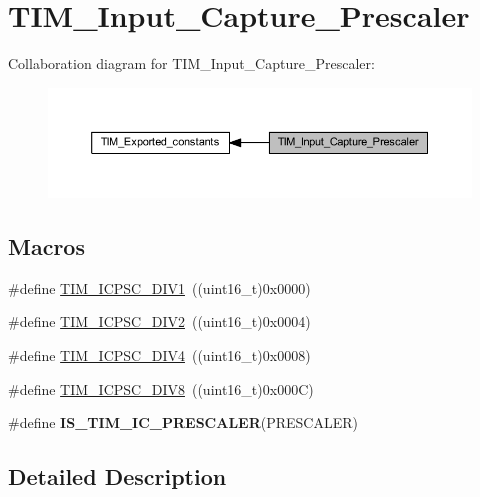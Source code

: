 \hypertarget{group___t_i_m___input___capture___prescaler}{}\section{T\+I\+M\+\_\+\+Input\+\_\+\+Capture\+\_\+\+Prescaler}
\label{group___t_i_m___input___capture___prescaler}
Collaboration diagram for T\+I\+M\+\_\+\+Input\+\_\+\+Capture\+\_\+\+Prescaler\+:
\nopagebreak
\begin{figure}[H]
\begin{center}
\leavevmode
\includegraphics[width=350pt]{group___t_i_m___input___capture___prescaler}
\end{center}
\end{figure}
\subsection*{Macros}
\begin{DoxyCompactItemize}
\item 
\#define \hyperlink{group___t_i_m___input___capture___prescaler_ga8acb44abe3147d883685c1f9f1ce410e}{T\+I\+M\+\_\+\+I\+C\+P\+S\+C\+\_\+\+D\+I\+V1}~((uint16\+\_\+t)0x0000)
\item 
\#define \hyperlink{group___t_i_m___input___capture___prescaler_ga1d8a7b66add914e2ddd910d2d700978f}{T\+I\+M\+\_\+\+I\+C\+P\+S\+C\+\_\+\+D\+I\+V2}~((uint16\+\_\+t)0x0004)
\item 
\#define \hyperlink{group___t_i_m___input___capture___prescaler_gaf5a675046430fa0f0c95b0dac612828f}{T\+I\+M\+\_\+\+I\+C\+P\+S\+C\+\_\+\+D\+I\+V4}~((uint16\+\_\+t)0x0008)
\item 
\#define \hyperlink{group___t_i_m___input___capture___prescaler_ga5086cb03c89a5c67b199d20b605f00cb}{T\+I\+M\+\_\+\+I\+C\+P\+S\+C\+\_\+\+D\+I\+V8}~((uint16\+\_\+t)0x000\+C)
\item 
\#define {\bfseries I\+S\+\_\+\+T\+I\+M\+\_\+\+I\+C\+\_\+\+P\+R\+E\+S\+C\+A\+L\+ER}(P\+R\+E\+S\+C\+A\+L\+ER)
\end{DoxyCompactItemize}


\subsection{Detailed Description}


